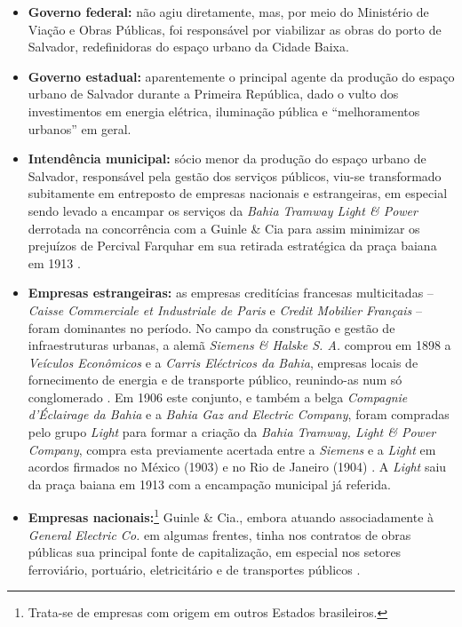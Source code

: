 \begin{itemize}
\item \textbf{Governo federal:} não agiu diretamente, mas, por meio do Ministério de Viação e Obras Públicas, foi responsável por viabilizar as obras do porto de Salvador, redefinidoras do espaço urbano da Cidade Baixa.
\item \textbf{Governo estadual:} aparentemente o principal agente da produção do espaço urbano de Salvador durante a Primeira República, dado o vulto dos investimentos em energia elétrica, iluminação pública e ``melhoramentos urbanos'' em geral.
\item \textbf{Intendência municipal:} sócio menor da produção do espaço urbano de Salvador, responsável pela gestão dos serviços públicos, viu-se transformado subitamente em entreposto de empresas nacionais e estrangeiras, em especial sendo levado a encampar os serviços da \textit{Bahia Tramway Light \& Power} derrotada na concorrência com a Guinle \& Cia para assim minimizar os prejuízos de Percival Farquhar em sua retirada estratégica da praça baiana em 1913 \cite[p.~76-89]{CUNHA2011}. 
\item \textbf{Empresas estrangeiras:} as empresas creditícias francesas multicitadas -- \textit{Caisse Commerciale et Industriale de Paris} e \textit{Credit Mobilier Français} -- foram dominantes no período. No campo da construção e gestão de infraestruturas urbanas, a alemã \textit{Siemens \& Halske S. A.} comprou em 1898 a \textit{Veículos Econômicos} e a \textit{Carris Eléctricos da Bahia}, empresas locais de fornecimento de energia e de transporte público, reunindo-as num só conglomerado \cite[p.~36]{CUNHA2011}. Em 1906 este conjunto, e também a belga \textit{Compagnie d'Éclairage da Bahia} e a \textit{Bahia Gaz and Electric Company}, foram compradas pelo grupo \textit{Light} para formar a criação da \textit{Bahia Tramway, Light \& Power Company}, compra esta previamente acertada entre a \textit{Siemens} e a \textit{Light} em acordos firmados no México (1903) e no Rio de Janeiro (1904) \cite[p.~34]{CUNHA2011}. A \textit{Light} saiu da praça baiana em 1913 com a encampação municipal já referida.
\item \textbf{Empresas nacionais:}\footnote{Trata-se de empresas com origem em outros Estados brasileiros.} Guinle \& Cia., embora atuando associadamente à \textit{General Electric Co.} em algumas frentes, tinha nos contratos de obras públicas sua principal fonte de capitalização, em especial nos setores ferroviário, portuário, eletricitário e de transportes públicos \cite[p.~43-44]{CUNHA2011}.

\end{itemize}
